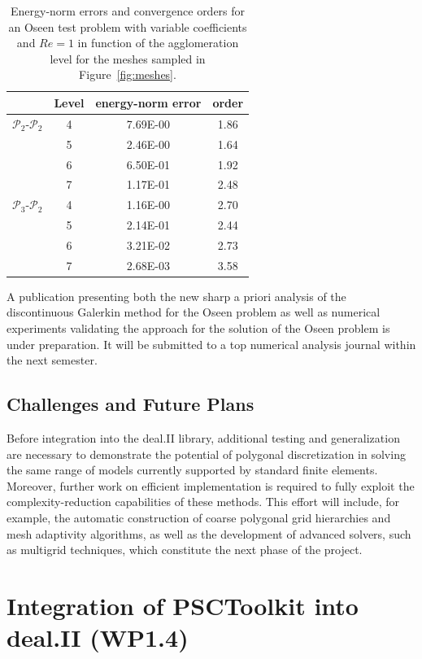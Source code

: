 \documentclass[a4paper,12pt]{article}
\begin{document}
\begin{table}[!ht]\centering
\caption{Energy-norm errors and convergence orders for an Oseen test problem with variable coefficients and $Re=1$ in function of the agglomeration level for the meshes sampled in Figure~\ref{fig:meshes}.}
\label{tab:meshes}
{\small
\begin{tabular}[c]{cc|cc}\hline\hline%
&{Level}&energy-norm error&order\\ \hline
{$\mathcal{P}_2$-$\mathcal{P}_2$}
&4 &7.69E-00&1.86\\
&5 &2.46E-00&1.64\\
&6 &6.50E-01&1.92\\
&7 &1.17E-01&2.48\\
\hline
{$\mathcal{P}_3$-$\mathcal{P}_2$}
&4 &1.16E-00&2.70\\
&5 &2.14E-01&2.44\\
&6 &3.21E-02&2.73\\
&7 &2.68E-03&3.58\\
\hline\hline
\end{tabular}}
\label{tab:oseen}
\end{table}
A publication presenting both the new sharp a priori analysis of the discontinuous Galerkin method for the Oseen problem as well as numerical experiments validating the approach for the solution of the Oseen problem is under preparation. It will be submitted to a top numerical analysis journal within the next semester.


 \subsection{Challenges and Future Plans}

Before integration into the deal.II library, additional testing and generalization are necessary to demonstrate the potential of polygonal discretization in solving the same range of models currently supported by standard finite elements. Moreover, further work on efficient implementation is required to fully exploit the complexity-reduction capabilities of these methods. This effort will include, for example, the automatic construction of coarse polygonal grid hierarchies and mesh adaptivity algorithms, as well as the development of advanced solvers, such as multigrid techniques, which constitute the next phase of the project.


\section{Integration of PSCToolkit into deal.II (WP1.4)}
\end{document}
